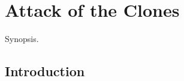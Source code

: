\chapter{Attack of the Clones}

\graphicspath{{figures/chapter-3/}}


\begin{synopsis}
	Synopsis.
\end{synopsis}


\section{Introduction}

\lipsum[7-10]
\cite{Salmon2006}

